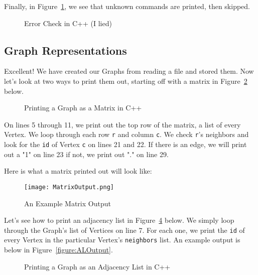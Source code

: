 \documentclass[letterpaper, 10pt,DIV=13]{scrartcl}
\numberwithin{equation}{section} %
\numberwithin{figure}{section} %
\numberwithin{table}{section} %
\begin{document}
Finally, in Figure~\ref{figure:ErrorCheck}, we see that unknown commands are printed, then skipped.

\begin{figure}[h] 
    \centering 
    
    \caption{Error Check in C++ (I lied)}
    \label{figure:ErrorCheck}
\end{figure}


\subsection{Graph Representations}
Excellent! We have created our Graphs from reading a file and stored them. Now let's look at two ways to print them out, starting off with a matrix in Figure~\ref{figure:MatrixCode} below.

\begin{figure}[h] 
    \centering 
    
    \caption{Printing a Graph as a Matrix in C++}
    \label{figure:MatrixCode}
\end{figure}



On lines 5 through 11, we print out the top row of the matrix, a list of every Vertex. We loop through each row \texttt{r} and column \texttt{c}. We check \texttt{r}'s neighbors and look for the \texttt{id} of Vertex \texttt{c} on lines 21 and 22. If there is an edge, we will print out a "1"  on line 23 if not, we print out "." on line 29. 

\pagebreak

Here is what a matrix printed out will look like:
\begin{figure}[h] 
    \centering 
    \texttt{[image: MatrixOutput.png]}
    \caption{An Example Matrix Output}
    \label{figure:MatrixOutput}
    
\end{figure}


Let's see how to print an adjacency list in Figure~\ref{figure:AdjListCode} below. We simply loop through the Graph's list of Vertices on line 7. For each one, we print the \texttt{id} of every Vertex in the particular Vertex's \texttt{neighbors} list. An example output is below in Figure~\ref{figure:ALOutput}.

\begin{figure}[h] 
    \centering 
    
    \caption{Printing a Graph as an Adjacency List in C++}
    \label{figure:AdjListCode}
\end{figure}
\end{document}
